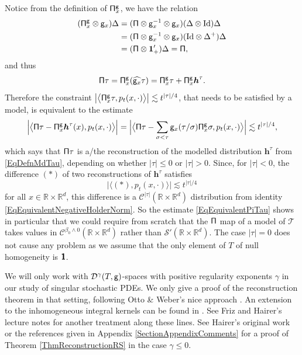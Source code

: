 \documentclass[10pt, reqno]{amsart}
\numberwithin{subsection}{section}
\numberwithin{subsubsection}{subsection}
\numberwithin{equation}{section} %
\theoremstyle{mystyle}
\theoremstyle{mystyle2}
\theoremstyle{mystyle3}
\newcommand{\iden}{\text{\rm Id}}
\newcommand{\bsh}{\boldsymbol{h}}
\newcommand{\ssk}{\smallskip}
\newcommand\bbR{\mathbb{R}}
\newcommand{\mcC}{\mathcal{C}}
\newcommand{\mcD}{\mathcal{D}}
\newcommand\mcS{\mathcal{S}}
\begin{document}
Notice from the definition of ${\sf\Pi}^{\sf g}_x$, we have the relation
\begin{align*}
({\sf\Pi}_x^{\sf g}\otimes{\sf g}_x)\Delta
&=({\sf\Pi}\otimes{\sf g}_x^{-1}\otimes{\sf g}_x)(\Delta\otimes\iden)\Delta\\
&=({\sf\Pi}\otimes{\sf g}_x^{-1}\otimes{\sf g}_x)(\iden\otimes\Delta^+)\Delta\\
&=({\sf\Pi}\otimes{\bf1}_+')\Delta={\sf\Pi},
\end{align*}
and thus
$$
{\sf\Pi}\tau={\sf\Pi}_x^{\sf g}(\widehat{{\sf g}_x}\tau)={\sf\Pi}_x^{\sf g}\tau+{\sf\Pi}_x^{\sf g}\bsh^\tau.
$$
Therefore the constraint $\big|\big\langle{\sf\Pi}^{\sf g}_x\tau , p_t(x,\cdot) \big\rangle\big|  \lesssim t^{|\tau|/4}$, that needs to be satisfied by a model, is equivalent to the estimate
\begin{equation} \label{EqEquivalentPiTau}
\Big|\big\langle {\sf \Pi}\tau - {\sf\Pi}^{\sf g}_x \bsh^\tau(x) , p_t(x,\cdot)\big\rangle\Big| = \Big|\big\langle {\sf \Pi}\tau - \sum_{\sigma<\tau} {\sf g}_x(\tau/\sigma){\sf\Pi}^{\sf g}_x\sigma , p_t(x,\cdot)\big\rangle\Big|  \lesssim t^{|\tau|/4},
\end{equation}
which says that ${\sf \Pi}\tau$ is a/the reconstruction of the modelled distribution $\bsh^\tau$ from \eqref{EqDefnMdTau}, depending on whether $\vert\tau\vert\leq 0$ or $\vert\tau\vert>0$. Since, for $\vert\tau\vert<0$, the difference $(\ast)$ of two reconstructions of $\bsh^\tau$ satisfies
$$
\big\vert\big\langle(\ast),p_t(x,\cdot)\big\rangle\big\vert \lesssim t^{\vert\tau\vert/4}
$$
for all $x\in\bbR\times\bbR^d$, this difference is a $\mcC^{\vert\tau\vert}(\bbR\times\bbR^d)$ distribution from identity \eqref{EqEquivalentNegativeHolderNorm}. So the estimate \eqref{EqEquivalentPiTau} shows in particular that we could require from scratch that the $\sf \Pi$ map of a model 
of $\mathscr{T}$ takes values in $\mcC^{\beta_0\wedge 0}(\bbR\times\bbR^d)$ rather than $\mcS'(\bbR\times\bbR^d)$. The case $\vert\tau\vert=0$ does not cause any problem as we assume that the only element of $T$ of null homogeneity is $\textbf{\textsf{1}}$. 

\ssk

We will only work with $\mcD^\gamma(T,\sf g)$-spaces with positive regularity exponents $\gamma$ in our study of singular stochastic PDEs. We only 
give a proof of the reconstruction theorem in that setting, following Otto \& Weber's nice approach \cite{OttoWeber}. An extension to the inhomogeneous integral kernels can be found in \cite{Hos23}. See Friz and Hairer's lecture notes \cite{FrizHairerBook} for another treatment along these lines. See Hairer's original work \cite{Hai14} or the references given in Appendix {\sf \ref{SectionAppendixComments}} for a proof of Theorem \ref{ThmReconstructionRS} in the case $\gamma\leq 0$.
\end{document}
